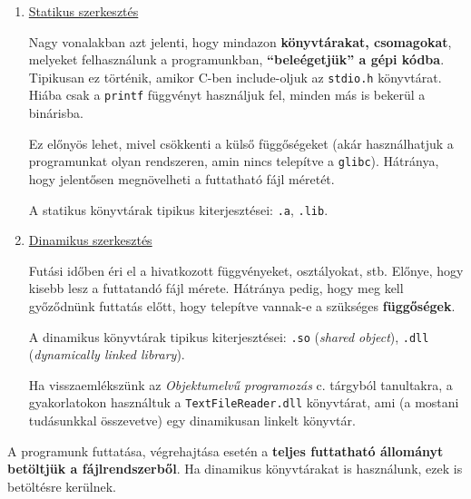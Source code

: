 \begin{enumerate}
	\item \underline{Statikus szerkesztés}
	
	Nagy vonalakban azt jelenti, hogy mindazon \textbf{könyvtárakat, csomagokat}, melyeket felhasználunk a programunkban, \textbf{``beleégetjük'' a gépi kódba}. Tipikusan ez történik, amikor C-ben include-oljuk az \texttt{stdio.h} könyvtárat. Hiába csak a \texttt{printf} függvényt használjuk fel, minden más is bekerül a binárisba.
	
	Ez előnyös lehet, mivel csökkenti a külső függőségeket (akár használhatjuk a programunkat olyan rendszeren, amin nincs telepítve a \texttt{glibc}). Hátránya, hogy jelentősen megnövelheti a futtatható fájl méretét.
	
	A statikus könyvtárak tipikus kiterjesztései: \texttt{.a}, \texttt{.lib}.
	
	\item \underline{Dinamikus szerkesztés}
	
	Futási időben éri el a hivatkozott függvényeket, osztályokat, stb. Előnye, hogy kisebb lesz a futtatandó fájl mérete. Hátránya pedig, hogy meg kell győződnünk futtatás előtt, hogy telepítve vannak-e a szükséges \textbf{függőségek}.
	
	A dinamikus könyvtárak tipikus kiterjesztései: \texttt{.so} (\textit{shared object}), \texttt{.dll} (\textit{dynamically linked library}).
	
	Ha visszaemlékszünk az \textit{Objektumelvű programozás} c. tárgyból tanultakra, a gyakorlatokon használtuk a \texttt{TextFileReader.dll} könyvtárat, ami (a mostani tudásunkkal összevetve) egy dinamikusan linkelt könyvtár.
\end{enumerate}

A programunk futtatása, végrehajtása esetén a \textbf{teljes futtatható állományt betöltjük a fájlrendszerből}. Ha dinamikus könyvtárakat is használunk, ezek is betöltésre kerülnek.